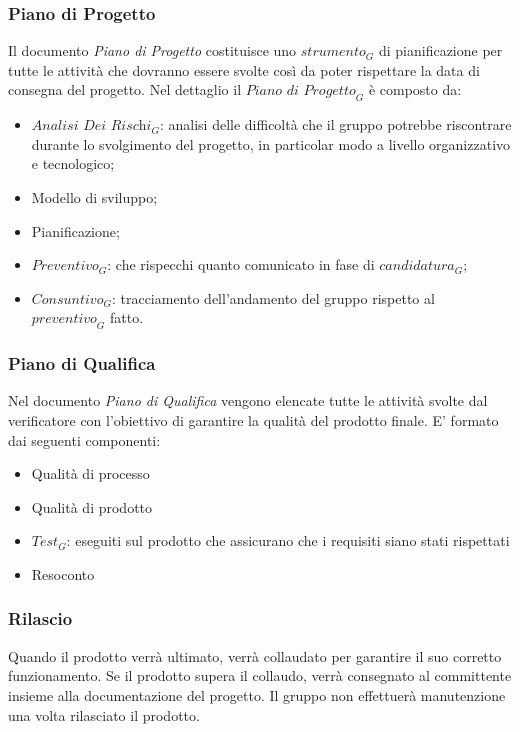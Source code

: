 \subsubsection{Piano di Progetto}
Il documento \textit{Piano di Progetto} costituisce uno $\textit{strumento}_G$ di pianificazione per tutte le attività che dovranno essere svolte così da poter rispettare la data di consegna del progetto.
Nel dettaglio il $\textit{Piano di Progetto}_G$ è composto da:
\begin{itemize}
    \item $\textit{Analisi Dei Rischi}_G$: analisi delle difficoltà che il gruppo potrebbe riscontrare durante lo svolgimento del progetto, in particolar modo a livello organizzativo e tecnologico;
    \item Modello di sviluppo;
    \item Pianificazione;
    \item $\textit{Preventivo}_G$: che rispecchi quanto comunicato in fase di $\textit{candidatura}_G$;
    \item $\textit{Consuntivo}_G$: tracciamento dell'andamento del gruppo rispetto al $\textit{preventivo}_G$ fatto.
\end{itemize}
\subsubsection{Piano di Qualifica}
Nel documento \textit{Piano di Qualifica} vengono elencate tutte le attività svolte dal verificatore con l'obiettivo di garantire la qualità del prodotto finale.
E' formato dai seguenti componenti:
\begin{itemize}
    \item Qualità di processo
    \item Qualità di prodotto
    \item $\textit{Test}_G$: eseguiti sul prodotto che assicurano che i requisiti siano stati rispettati
    \item Resoconto
\end{itemize}
\subsubsection{Rilascio}
Quando il prodotto verrà ultimato, verrà collaudato per garantire il suo corretto funzionamento. Se il prodotto supera il collaudo, verrà consegnato al committente insieme alla documentazione del progetto. 
Il gruppo non effettuerà manutenzione una volta rilasciato il prodotto.
